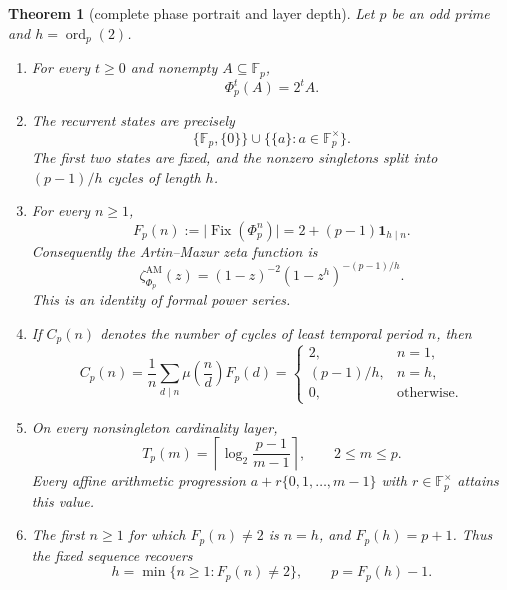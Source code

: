 \documentclass[11pt,a4paper]{amsart}
\newtheorem{theorem}{Theorem}[section]
\theoremstyle{definition}
\theoremstyle{remark}
\newcommand{\Fp}{\mathbb F_p}
\newcommand{\Fix}{\operatorname{Fix}}
\newcommand{\ord}{\operatorname{ord}}
\newcommand{\card}[1]{\lvert #1\rvert}
\newcommand{\mob}{\mu}
\newcommand{\AM}{\mathrm{AM}}
\begin{document}
\begin{theorem}[complete phase portrait and layer depth]\label{thm:main}
Let $p$ be an odd prime and $h=\ord_p(2)$.
\begin{enumerate}
\item For every $t\geq0$ and nonempty $A\subseteq\Fp$,
  \begin{equation}\label{eq:iterate}
   \Phi_p^t(A)=2^tA.
  \end{equation}
\item The recurrent states are precisely
  \begin{equation}\label{eq:recurrent-set}
   \{\Fp,\{0\}\}\cup\{\{a\}:a\in\Fp^\times\}.
  \end{equation}
  The first two states are fixed, and the nonzero singletons split into
  $(p-1)/h$ cycles of length $h$.
\item For every $n\geq1$,
  \begin{equation}\label{eq:fixed-count}
   F_p(n):=\card{\Fix(\Phi_p^n)}
   =2+(p-1)\mathbf 1_{h\mid n}.
  \end{equation}
  Consequently the Artin--Mazur zeta function is
  \begin{equation}\label{eq:zeta}
   \zeta_{\Phi_p}^{\AM}(z)
   =(1-z)^{-2}(1-z^h)^{-(p-1)/h}.
  \end{equation}
  This is an identity of formal power series.
\item If $C_p(n)$ denotes the number of cycles of least temporal period
  $n$, then
  \begin{equation}\label{eq:cycle-census}
   C_p(n)=\frac1n\sum_{d\mid n}\mob\!\left(\frac nd\right)F_p(d)
   =\begin{cases}
     2,&n=1,\\
     (p-1)/h,&n=h,\\
     0,&\text{otherwise}.
   \end{cases}
  \end{equation}
\item On every nonsingleton cardinality layer,
  \begin{equation}\label{eq:layer-depth}
   \boxed{\displaystyle
   T_p(m)=\left\lceil\log_2\frac{p-1}{m-1}\right\rceil,
   \qquad 2\leq m\leq p.}
  \end{equation}
  Every affine arithmetic progression
  $a+r\{0,1,\ldots,m-1\}$ with $r\in\Fp^\times$ attains this value.
\item The first $n\geq1$ for which $F_p(n)\ne2$ is $n=h$, and
  $F_p(h)=p+1$.  Thus the fixed sequence recovers
  \begin{equation}\label{eq:recovery}
   h=\min\{n\geq1:F_p(n)\ne2\},
   \qquad p=F_p(h)-1.
  \end{equation}
\end{enumerate}
\end{theorem}
\end{document}
